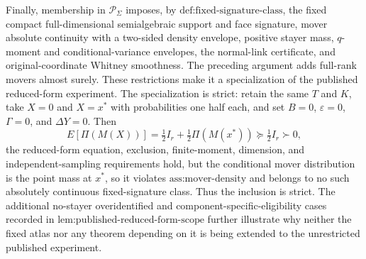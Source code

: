 Finally, membership in \(\mathcal P_\Sigma\) imposes, by \(\text{def:fixed-signature-class}\), the fixed compact full-dimensional semialgebraic support and face signature, mover absolute continuity with a two-sided density envelope, positive stayer mass, \(q\)-moment and conditional-variance envelopes, the normal-link certificate, and original-coordinate Whitney smoothness. The preceding argument adds full-rank movers almost surely. These restrictions make it a specialization of the published reduced-form experiment. The specialization is strict: retain the same \(T\) and \(K\), take \(X=0\) and \(X=x^*\) with probabilities one half each, and set \(B=0\), \(\varepsilon=0\), \(\Gamma=0\), and \(\Delta Y=0\). Then
\[
 E[\Pi(M(X))]
 =\tfrac12 I_r+\tfrac12\Pi(M(x^*))
 \succeq\tfrac12 I_r\succ0,
\]
the reduced-form equation, exclusion, finite-moment, dimension, and independent-sampling requirements hold, but the conditional mover distribution is the point mass at \(x^*\), so it violates \(\text{ass:mover-density}\) and belongs to no such absolutely continuous fixed-signature class. Thus the inclusion is strict. The additional no-stayer overidentified and component-specific-eligibility cases recorded in \(\text{lem:published-reduced-form-scope}\) further illustrate why neither the fixed atlas nor any theorem depending on it is being extended to the unrestricted published experiment.
